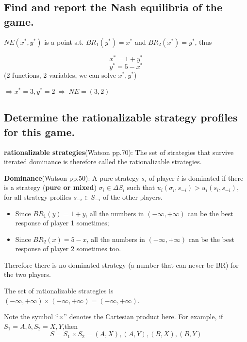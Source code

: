 \documentclass{article}
\begin{document}
\subsection{Find and report the Nash equilibria of the game.}

$NE(x^*,y^*)$ is a point s.t. $BR_1(y^*) = x^*$ and $BR_2(x^*)=y^*$, thus

$$x^* = 1+y^*$$
$$y^* = 5-x^*$$
(2 functions, 2 variables, we can solve $x^*,y^*$)

$\Rightarrow x^*= 3, y^*=2 \ \Rightarrow \ NE=(3,2)$

\subsection{Determine the rationalizable strategy profiles for this game.}

\begin{mdframed}[backgroundcolor=blue!20,linecolor=white]

\textbf{rationalizable strategies}(Watson pp.70): The set of strategies that
survive iterated dominance is therefore called the rationalizable strategies.

\textbf{Dominance}(Watson pp.50): A pure strategy $s_i$ of player $i$ is dominated if there is a strategy (\textbf{pure or mixed}) $\sigma_i \in \Delta S_i$ such that $u_i(\sigma_i , s_{−i}) > u_i (s_i , s_{−i})$, for all strategy profiles $s_{−i} \in S_{−i}$ of the other players.

\end{mdframed}

\begin{itemize}
\item Since $BR_1(y) = 1+y$, all the numbers in $(-\infty,+\infty)$ can be the best response of player 1 sometimes;
\item Since $BR_2(x) = 5-x$, all the numbers  in $(-\infty,+\infty)$ can be the best response of player 2 sometimes too.

\end{itemize}

Therefore there is no dominated strategy (a number that can never be BR) for the two players.

The set of rationalizable strategies is $(-\infty, +\infty) \times (-\infty, +\infty) = (-\infty, +\infty)$.

\begin{mdframed}[backgroundcolor=blue!20,linecolor=white]
Note the symbol ``$\times$'' denotes the Cartesian product here. For example, if $S_1={A,b}, S_2={X,Y}$,then $$S= S_1 \times S_2 = {(A,X),(A,Y),(B,X),(B,Y)}$$
\end{mdframed}
\end{document}
